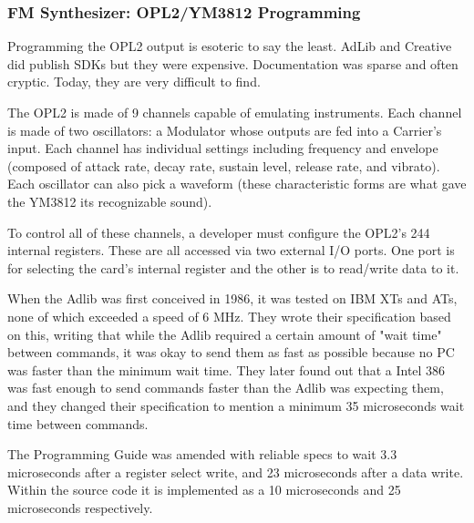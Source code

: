 \documentclass[book.tex]{subfiles}
\begin{document}
\subsubsection{FM Synthesizer: OPL2/YM3812 Programming}
\label{IMF_explanation}
\par
Programming the OPL2 output is esoteric to say the least. AdLib and Creative did publish SDKs but they were expensive.  Documentation was sparse and often cryptic. Today, they are very difficult to find.\\
\par
The OPL2 is made of 9 channels capable of emulating instruments. Each channel is made of two oscillators: a Modulator whose outputs are fed into a Carrier's input. Each channel has individual settings including frequency and envelope (composed of attack rate, decay rate, sustain level, release rate, and vibrato). Each oscillator can also pick a waveform (these characteristic forms are what gave the YM3812 its recognizable sound).\\
\par
 To control all of these channels, a developer must configure the OPL2's 244 internal registers. These are all accessed via two external I/O ports. One port is for selecting the card's internal register and the other is to read/write data to it.\\
\par
\begin{minipage}{\textwidth}

\end{minipage}
\par
When the Adlib was first conceived in 1986, it was tested on IBM XTs and ATs, none of which exceeded a speed of 6 MHz. They wrote their specification based on this, writing that while the Adlib required a certain amount of "wait time" between commands, it was okay to send them as fast as possible because no PC was faster than the minimum wait time. They later found out that a Intel 386 was fast enough to send commands faster than the Adlib was expecting them, and they changed their specification to mention a minimum 35 microseconds wait time between commands.\\

\par
The Programming Guide was amended with reliable specs to wait 3.3 microseconds after a register select write, and 23 microseconds after a data write. Within the source code it is implemented as a 10 microseconds and 25 microseconds respectively.
\par
\begin{minipage}{\textwidth}

\end{minipage}
\par
\end{document}
